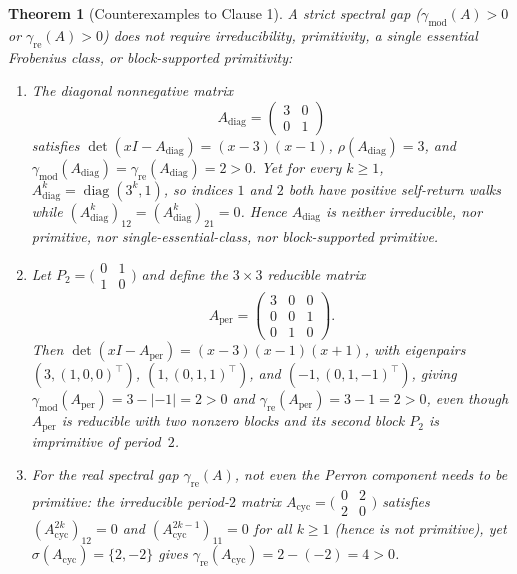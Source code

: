 \documentclass[11pt]{article}
\newtheorem{theorem}{Theorem}[section]
\theoremstyle{definition}
\DeclareMathOperator{\diag}{diag}
\begin{document}
\begin{theorem}[Counterexamples to Clause 1]\label{thm:clause1}
A strict spectral gap ($\gamma_{\mathrm{mod}}(A) > 0$ or $\gamma_{\mathrm{re}}(A) > 0$) does not require irreducibility, primitivity, a single essential Frobenius class, or block-supported primitivity:
\begin{enumerate}
  \item[(a)] The diagonal nonnegative matrix
    \[
      A_{\mathrm{diag}} = \begin{pmatrix} 3 & 0 \\ 0 & 1 \end{pmatrix}
    \]
    satisfies $\det(x I - A_{\mathrm{diag}}) = (x - 3)(x - 1)$, $\rho(A_{\mathrm{diag}}) = 3$, and $\gamma_{\mathrm{mod}}(A_{\mathrm{diag}}) = \gamma_{\mathrm{re}}(A_{\mathrm{diag}}) = 2 > 0$. Yet for every $k \ge 1$, $A_{\mathrm{diag}}^k = \diag(3^k, 1)$, so indices $1$ and $2$ both have positive self-return walks while $(A_{\mathrm{diag}}^k)_{12} = (A_{\mathrm{diag}}^k)_{21} = 0$. Hence $A_{\mathrm{diag}}$ is neither irreducible, nor primitive, nor single-essential-class, nor block-supported primitive.
  \item[(b)] Let $P_2 = \bigl(\begin{smallmatrix} 0 & 1 \\ 1 & 0 \end{smallmatrix}\bigr)$ and define the $3 \times 3$ reducible matrix
    \[
      A_{\mathrm{per}} = \begin{pmatrix} 3 & 0 & 0 \\ 0 & 0 & 1 \\ 0 & 1 & 0 \end{pmatrix}.
    \]
    Then $\det(x I - A_{\mathrm{per}}) = (x - 3)(x - 1)(x + 1)$, with eigenpairs $(3, (1,0,0)^\top)$, $(1, (0,1,1)^\top)$, and $(-1, (0,1,-1)^\top)$, giving $\gamma_{\mathrm{mod}}(A_{\mathrm{per}}) = 3 - |-1| = 2 > 0$ and $\gamma_{\mathrm{re}}(A_{\mathrm{per}}) = 3 - 1 = 2 > 0$, even though $A_{\mathrm{per}}$ is reducible with two nonzero blocks and its second block $P_2$ is imprimitive of period~$2$.
  \item[(c)] For the real spectral gap $\gamma_{\mathrm{re}}(A)$, not even the Perron component needs to be primitive: the irreducible period-$2$ matrix $A_{\mathrm{cyc}} = \bigl(\begin{smallmatrix} 0 & 2 \\ 2 & 0 \end{smallmatrix}\bigr)$ satisfies $(A_{\mathrm{cyc}}^{2k})_{12} = 0$ and $(A_{\mathrm{cyc}}^{2k-1})_{11} = 0$ for all $k \ge 1$ (hence is not primitive), yet $\sigma(A_{\mathrm{cyc}}) = \{2, -2\}$ gives $\gamma_{\mathrm{re}}(A_{\mathrm{cyc}}) = 2 - (-2) = 4 > 0$.
\end{enumerate}
\end{theorem}
\end{document}
